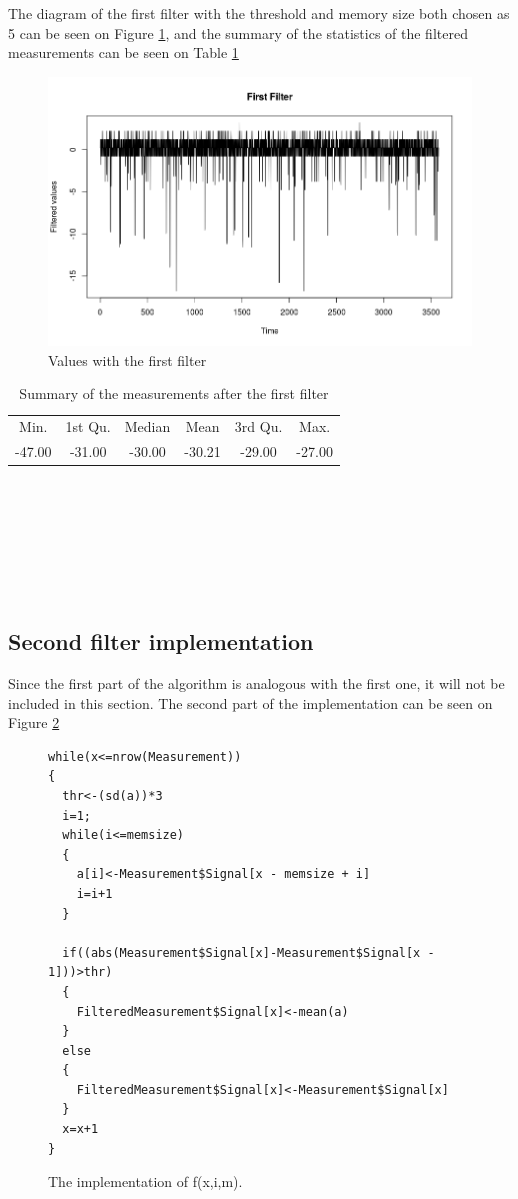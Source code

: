 The diagram of the first filter with the threshold and memory size both chosen as 5 can be seen on  Figure \ref{fig:FirstZero}, and the summary of the statistics of the filtered measurements can be seen on Table \ref{tab:summaryB}
\begin{figure}[!h]
	\centering
		\includegraphics[width=.9\linewidth]{figures/FirstFilterZeroV1.png}
		\caption{Values with the first filter }\label{fig:FirstZero}	
\end{figure}
		\begin{table}[h]
		\centering
		\caption{Summary of the measurements after the first filter }\label{tab:summaryB}
		\begin{tabular}{cccccc}
		Min.& 1st Qu. & Median & Mean & 3rd Qu. & Max.\\
		-47.00 & -31.00 & -30.00 & -30.21 & -29.00 & -27.00
		\end{tabular}
		\end{table}
		\\\\\\\\\\\\
\subsection{Second filter implementation}
Since the first part of the algorithm is analogous with the first one, it will not be included in this section.
The second part of the implementation can be seen on Figure \ref{fig:code2}
\begin{figure}[h!]
\fontsize{14}{2}
	\begin{lstlisting}
while(x<=nrow(Measurement))
{
  thr<-(sd(a))*3
  i=1;
  while(i<=memsize)
  {
    a[i]<-Measurement$Signal[x - memsize + i]
    i=i+1
  }
  
  if((abs(Measurement$Signal[x]-Measurement$Signal[x - 1]))>thr)
  {
    FilteredMeasurement$Signal[x]<-mean(a)
  }
  else
  {
    FilteredMeasurement$Signal[x]<-Measurement$Signal[x]
  }
  x=x+1
}

	\end{lstlisting}
	\caption{The implementation of f(x,i,m). }\label{fig:code2}
\end{figure} 


